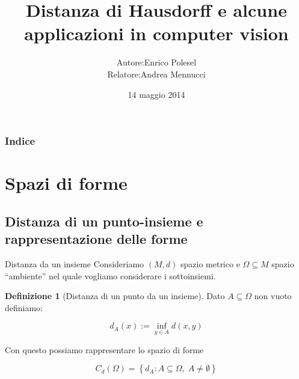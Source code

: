 \documentclass{beamer}
\newcounter{counter1}
\theoremstyle{plain}
\theoremstyle{definition}
\newtheorem{mydef}[counter1]{Definizione}
\theoremstyle{remark}
\newcommand{\set}[1]{\left\{#1\right\}}
\begin{document}
\title[Distanza di Hausdorff e applicazioni in computer
vision]{Distanza di Hausdorff e alcune applicazioni in computer
  vision}
\date{14 maggio 2014}

\author[Enrico Polesel]{\begin{tabular}{r@{ }l}
Autore: &  Enrico Polesel \\ 
Relatore: & Andrea Mennucci
\end{tabular}
}



\begin{frame}[plain]
  \titlepage
\end{frame}

\begin{frame}[plain]
 \frametitle{Indice}
 \tableofcontents
\end{frame}




\AtBeginSubsection[]
{
  \begin{frame}[plain]{\secname $\rightarrow$ \subsecname}
    \tableofcontents[currentsubsection]
  \end{frame}
}

\section{Spazi di forme}

\subsection{Distanza di un punto-insieme e rappresentazione delle forme}


\begin{frame}{Distanza da un insieme}
  Consideriamo $(M,d)$ spazio metrico e $\Omega \subseteq M$ spazio
  ``ambiente'' nel quale vogliamo considerare i sottoinsiemi.
  
  \begin{mydef}[Distanza di un punto da un insieme]
    Dato $A \subseteq \Omega$ non vuoto definiamo:
    
    \[  d_A (x) := \inf _{y \in A} d(x,y) \] 
  \end{mydef}
  
  Con questo possiamo rappresentare lo spazio di forme
  
  \[ C_d(\Omega) = \set{d_A : A \subseteq \Omega,\; A \neq \emptyset} \]
\end{frame}
\end{document}
